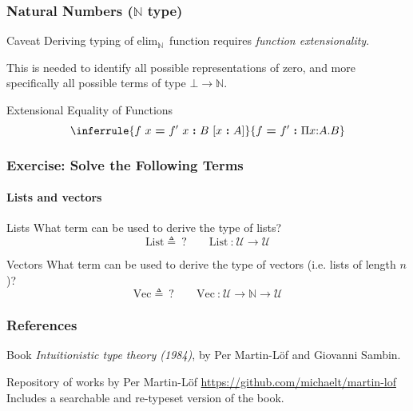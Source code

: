 \documentclass[mathserif,usenames,dvipsnames]{beamer}
\newcommand{\txt}[1]{\textrm{#1}}
\newcommand{\defeq}[0]{\ensuremath{\triangleq}}
\newcommand{\isterm}[2]{\ensuremath{#1 ~\textbf{{:}}~ #2}}
\newcommand{\eqterm}[3]{\ensuremath{#1 ~\textbf{=}~ #2 ~\textbf{{:}}~ #3}}
\newcommand{\hyps}[1]{\ensuremath{~[#1]}}
\newcommand{\hyp}[1]{\hyps{\isterm{x}{#1}}}
\newcommand{\Arr}[2]{\ensuremath{#1 \rightarrow #2}}
\newcommand{\Funv}[3]{\ensuremath{\Pi #1{:}#2. #3}}
\newcommand{\Fun}[2]{\Funv{x}{#1}{#2}}
\newcommand{\Type}[0]{\ensuremath{\mathcal{U}}}
\newcommand{\Bot}[0]{\ensuremath{\bot}}
\newcommand{\Listk}[0]{\ensuremath{\txt{List}}}
\newcommand{\Vectk}[0]{\ensuremath{\txt{Vec}}}
\newcommand{\Nat}[0]{\ensuremath{\mathbb{N}}}
\newcommand{\zero}[0]{\ensuremath{\txt{zero}}}
\newcommand{\elimNatk}[0]{\ensuremath{\txt{elim}_\Nat}}
\begin{document}
\begin{frame}
\frametitle{Natural Numbers ($\Nat$ type)}

\begin{block}{Caveat}
Deriving typing of \elimNatk~function requires \textit{function extensionality}.

This is needed to identify all possible representations of \zero, and more
specifically all possible terms of type \Arr{\Bot}{\Nat}.
\end{block}

\begin{block}{Extensional Equality of Functions}
$$
\inferrule{
  {\eqterm{f~x}{f'~x}{B} \hyp{A}}
}
{\eqterm{f}{f'}{\Fun{A}{B}}}
$$
\end{block}

\end{frame}

\begin{frame}
\frametitle{Exercise: Solve the Following Terms}
\framesubtitle{Lists and vectors}

\begin{block}{Lists}
What term can be used to derive the type of lists?
$$
\Listk \defeq ~?
\qquad
\isterm{\Listk}{\Arr{\Type}{\Type}}
$$
\end{block}

\begin{block}{Vectors}
What term can be used to derive the type of
vectors (i.e. lists of length $n$)?
$$
\Vectk \defeq ~?
\qquad
\isterm{\Vectk}{\Arr{\Type}{\Arr{\Nat}{\Type}}}
$$
\end{block}

\end{frame}

\begin{frame}
\frametitle{References}

\begin{block}{Book}
\textit{Intuitionistic type theory (1984)}, by
Per Martin-L{\"o}f and Giovanni Sambin.
\end{block}

\begin{block}{Repository of works by Per Martin-L{\"o}f}
\url{https://github.com/michaelt/martin-lof}\\
Includes a searchable and re-typeset version of the book.
\end{block}

\end{frame}
\end{document}
